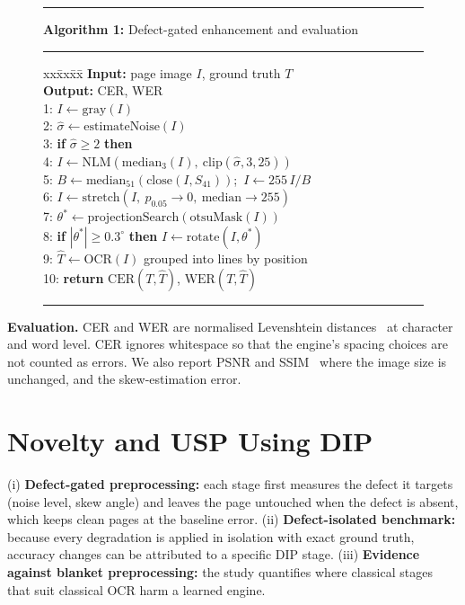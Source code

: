 \documentclass[conference]{IEEEtran}
\begin{document}
\begin{figure}[t]
\small
\hrule\vspace{2pt}
\textbf{Algorithm 1:} Defect-gated enhancement and evaluation
\vspace{2pt}\hrule\vspace{3pt}
\begin{tabbing}
xx\=xx\=xx\=\kill
\textbf{Input:} page image $I$, ground truth $T$\\
\textbf{Output:} CER, WER\\
1: $I \leftarrow \mathrm{gray}(I)$\\
2: $\hat\sigma \leftarrow \mathrm{estimateNoise}(I)$\\
3: \textbf{if} $\hat\sigma \ge 2$ \textbf{then}\\
4: \> $I \leftarrow \mathrm{NLM}(\mathrm{median}_3(I),\ \mathrm{clip}(\hat\sigma,3,25))$\\
5: $B \leftarrow \mathrm{median}_{51}(\mathrm{close}(I, S_{41}))$;\ $I \leftarrow 255\, I / B$\\
6: $I \leftarrow \mathrm{stretch}(I,\ p_{0.05} \to 0,\ \mathrm{median} \to 255)$\\
7: $\theta^{*} \leftarrow \mathrm{projectionSearch}(\mathrm{otsuMask}(I))$\\
8: \textbf{if} $|\theta^{*}| \ge 0.3^\circ$ \textbf{then} $I \leftarrow \mathrm{rotate}(I, \theta^{*})$\\
9: $\hat T \leftarrow \mathrm{OCR}(I)$ grouped into lines by position\\
10: \textbf{return} $\mathrm{CER}(T, \hat T)$, $\mathrm{WER}(T, \hat T)$
\end{tabbing}
\vspace{-6pt}\hrule
\end{figure}

\textbf{Evaluation.} CER and WER are normalised Levenshtein distances~\cite{levenshtein1966} at character and word level. CER ignores whitespace so that the engine's spacing choices are not counted as errors. We also report PSNR and SSIM~\cite{wang2004} where the image size is unchanged, and the skew-estimation error.

\section{Novelty and USP Using DIP}
(i) \textbf{Defect-gated preprocessing:} each stage first measures the defect it targets (noise level, skew angle) and leaves the page untouched when the defect is absent, which keeps clean pages at the baseline error. (ii) \textbf{Defect-isolated benchmark:} because every degradation is applied in isolation with exact ground truth, accuracy changes can be attributed to a specific DIP stage. (iii) \textbf{Evidence against blanket preprocessing:} the study quantifies where classical stages that suit classical OCR harm a learned engine.
\end{document}
